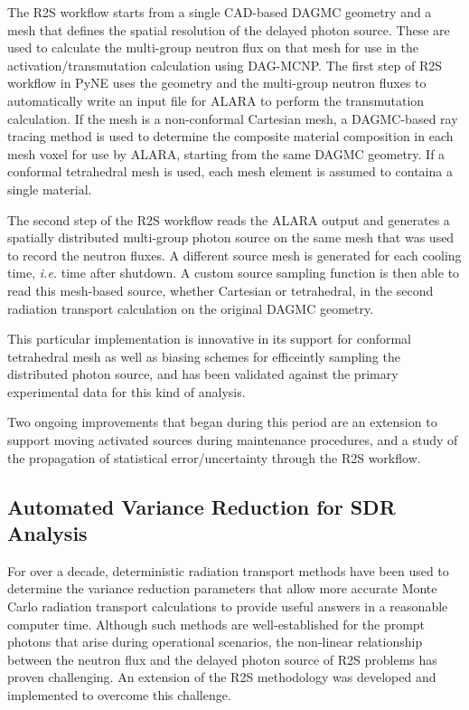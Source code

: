 The \gls{R2S} workflow starts from a single CAD-based \gls{DAGMC} geometry and
a mesh that defines the spatial resolution of the delayed photon source.
These are used to calculate the multi-group neutron flux on that mesh for use
in the activation/transmutation calculation using DAG-MCNP.  The first step of
\gls{R2S} workflow in PyNE uses the geometry and the multi-group neutron
fluxes to automatically write an input file for ALARA to perform the
transmutation calculation.  If the mesh is a non-conformal Cartesian mesh, a
\gls{DAGMC}-based ray tracing method is used to determine the composite
material composition in each mesh voxel for use by ALARA, starting from the
same \gls{DAGMC} geometry.  If a conformal tetrahedral mesh is used, each mesh
element is assumed to containa a single material.

The second step of the \gls{R2S} workflow reads the ALARA output and generates
a spatially distributed multi-group photon source on the same mesh that was
used to record the neutron fluxes.  A different source mesh is generated for
each cooling time, \emph{i.e.} time after shutdown.  A custom source sampling
function is then able to read this mesh-based source, whether Cartesian or
tetrahedral, in the second radiation transport calculation on the original
\gls{DAGMC} geometry.

This particular implementation is innovative in its support for conformal
tetrahedral mesh as well as biasing schemes for efficeintly sampling the
distributed photon source, and has been validated against the primary
experimental data for this kind of analysis\cite{biondo_r2s}.

Two ongoing improvements that began during this period are an extension to
support moving activated sources during maintenance procedures, and a study of
the propagation of statistical error/uncertainty through the \gls{R2S}
workflow.

\subsection{Automated Variance Reduction for \gls{SDR} Analysis}

For over a decade, deterministic radiation transport methods have been used to
determine the variance reduction parameters that allow more accurate Monte
Carlo radiation transport calculations to provide useful answers in a
reasonable computer time.  Although such methods are well-established for the
prompt photons that arise during operational scenarios, the non-linear
relationship between the neutron flux and the delayed photon source of
\gls{R2S} problems has proven challenging.  An extension of the \gls{R2S}
methodology was developed and implemented to overcome this challenge.

